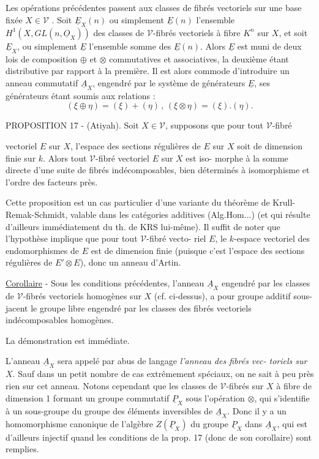 Les opérations précédentes passent aux classes de fibrés vectoriels
sur une base fixée $X \in \mathcal{V}$ . Soit $\underline{E}_X(n)$ ou simplement $\underline{E}(n)$ l'ensemble
$H^1(X, GL(n, \underline{O}_X))$ des classes de $\mathcal{V}$-fibrés vectoriels à fibre $K^n$ sur $X$, et
soit $\underline{E}_X$, ou simplement $\underline{E}$ l'ensemble somme des $\underline{E}(n)$. Alors $\underline{E}$ est muni
de deux lois de composition $\oplus$ et $\otimes$ commutatives et associatives, la
deuxième étant distributive par rapport à la première. Il est alors
commode d'introduire un anneau commutatif $\underline{A}_X$, engendré par le système
de générateurs $\underline{E}$, ses générateurs étant soumis aux relations :
$$ (\xi \oplus \eta) = (\xi) + (\eta) \,,\, (\xi \otimes \eta) = (\xi).(\eta) . $$

PROPOSITION 17 - (Atiyah). Soit $X \in \mathcal{V}$, supposons que pour tout $\mathcal{V}$-fibré

\newpage



vectoriel $E$ sur $X$, l'espace des sections régulières de $E$ sur $X$ soit de
dimension finie sur $k$. Alors tout $\mathcal{V}$-fibré vectoriel $E$ sur $X$ est iso-
morphe à la somme directe d'une suite de fibrés indécomposables, bien
déterminés à isomorphisme et l'ordre des facteurs près.

Cette proposition est un cas particulier d'une variante du théorème
de Krull-Remak-Schmidt, valable dans les catégories additives (Alg.Hom...)
(et qui résulte d'ailleurs immédiatement du th. de KRS lui-même). Il
suffit de noter que l'hypothèse implique que pour tout $\mathcal{V}$-fibré vecto-
riel $E$, le $k$-espace vectoriel des endomorphismes de $E$ est de dimension
finie (puisque c'est l'espace des sections régulières de $E' \otimes E$), donc un
anneau d'Artin.

\underline{Corollaire} - Sous les conditions précédentes, l'anneau $\underline{A}_X$ engendré par
les classes de $\mathcal{V}$-fibrés vectoriels homogènes sur $X$ (cf. ci-dessus), a
pour groupe additif sous-jacent le groupe libre engendré par les classes
des fibrés vectoriels indécomposables homogènes.

La démonstration est immédiate.

L'anneau $\underline{A}_X$ sera appelé par abus de langage \emph{l'anneau des fibrés vec-
toriels sur $X$}. Sauf dans un petit nombre de cas extrêmement spéciaux, on
ne sait à peu près rien sur cet anneau. Notons cependant que les classes
de $\mathcal{V}$-fibrés sur $X$ à fibre de dimension 1 formant un groupe commutatif
$\underline{P}_X$ sous l'opération $\otimes$, qui s'identifie à un sous-groupe du groupe des
éléments inversibles de $\underline{A}_X$. Donc il y a un homomorphisme canonique de
l'algèbre $Z(\underline{P}_X)$ du groupe $\underline{P}_X$ dans $\underline{A}_X$, qui est d'ailleurs injectif quand
les conditions de la prop. 17 (donc de son corollaire) sont remplies.

